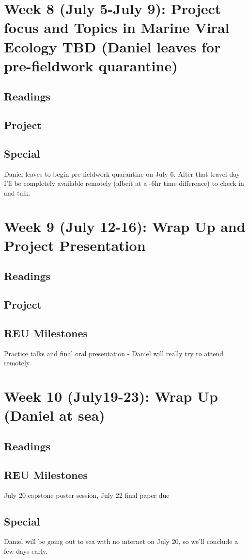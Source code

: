 \documentclass[11pt]{amsart}
\begin{document}
\section{Week 8 (July 5-July 9): Project focus and Topics in Marine Viral Ecology TBD (Daniel leaves for pre-fieldwork quarantine)}
\subsection{Readings}
\subsection{Project}
\subsection{Special} Daniel leaves to begin pre-fieldwork quarantine on July 6. After that travel day I'll be completely available remotely (albeit at a -6hr time difference) to check in and talk.
\section{Week 9 (July 12-16): Wrap Up and Project Presentation}
\subsection{Readings}
\subsection{Project}
\subsection{REU Milestones} Practice talks and final oral presentation - Daniel will really try to attend remotely. 
\section{Week 10 (July19-23): Wrap Up (Daniel at sea)}
\subsection{Readings}
\subsection{REU Milestones} July 20 capstone poster session, July 22 final paper due
\subsection{Special} Daniel will be going out to sea with no internet on July 20, so we'll conclude a few days early. 
\end{document}
